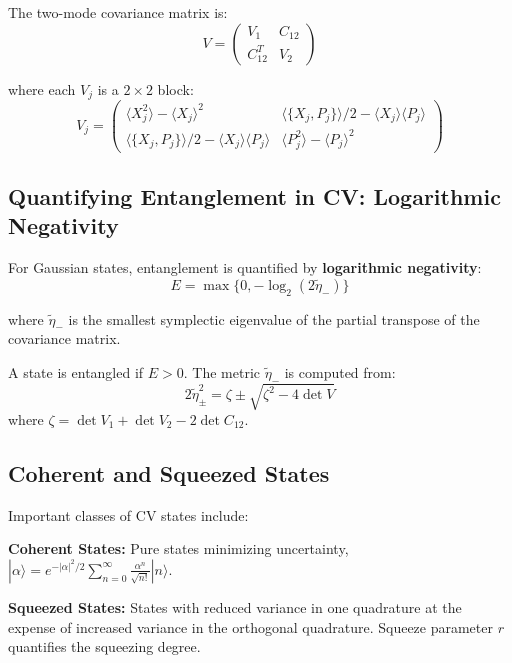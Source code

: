 The two-mode covariance matrix is:
\begin{equation}
V = \begin{pmatrix}
V_1 & C_{12} \\
C_{12}^T & V_2
\end{pmatrix}
\end{equation}

where each $V_j$ is a $2 \times 2$ block:
\begin{equation}
V_j = \begin{pmatrix}
\langle X_j^2 \rangle - \langle X_j \rangle^2 & \langle\{X_j, P_j\}\rangle/2 - \langle X_j \rangle\langle P_j \rangle \\
\langle\{X_j, P_j\}\rangle/2 - \langle X_j \rangle\langle P_j \rangle & \langle P_j^2 \rangle - \langle P_j \rangle^2
\end{pmatrix}
\end{equation}

\subsection{Quantifying Entanglement in CV: Logarithmic Negativity}

For Gaussian states, entanglement is quantified by \textbf{logarithmic negativity}:
\begin{equation}
E = \max\{0, -\log_2(2\tilde{\eta}_-)\}
\end{equation}

where $\tilde{\eta}_-$ is the smallest symplectic eigenvalue of the partial transpose of the covariance matrix.

A state is entangled if $E > 0$. The metric $\tilde{\eta}_-$ is computed from:
\begin{equation}
2\tilde{\eta}_{\pm}^2 = \zeta \pm \sqrt{\zeta^2 - 4\det V}
\end{equation}
where $\zeta = \det V_1 + \det V_2 - 2\det C_{12}$.

\subsection{Coherent and Squeezed States}

Important classes of CV states include:

\textbf{Coherent States:} Pure states minimizing uncertainty, $|\alpha\rangle = e^{-|\alpha|^2/2}\sum_{n=0}^{\infty} \frac{\alpha^n}{\sqrt{n!}}|n\rangle$.

\textbf{Squeezed States:} States with reduced variance in one quadrature at the expense of increased variance in the orthogonal quadrature. Squeeze parameter $r$ quantifies the squeezing degree.

